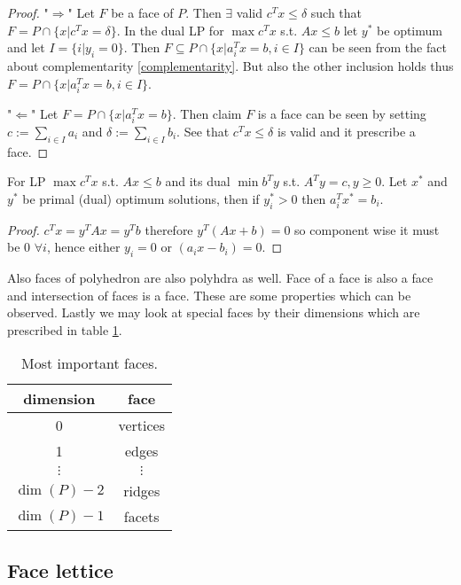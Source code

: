 \begin{proof}
	"$\Rightarrow$" Let $F$ be a face of $P$. Then $\exists$ valid $c^{T} x \leq \delta$ such that $F = P \cap \{x | c^{T} x = \delta\}$. In the dual LP for $\max c^{T} x$ s.t. $A x \leq b$ let $y^{\ast}$ be optimum and let $I = \{i | y_{i} = 0\}$. Then $F \subseteq P \cap \{x | a_{i}^{T} x = b, i \in I\}$ can be seen from the fact about complementarity \ref{complementarity}. But also the other inclusion holds thus  $F = P \cap \{x | a_{i}^{T} x = b, i \in I\}$.
	
	"$\Leftarrow$" Let $F = P \cap \{x | a_{i}^{T} x = b\}$. Then claim $F$ is a face can be seen by setting $c := \sum_{i \in I} a_{i}$ and $\delta := \sum_{i \in I} b_{i}$. See that $c^{T} x \leq \delta$ is valid and it prescribe a face.
\end{proof}

\begin{fact}[Complementarity]
	For LP $\max c^{T}x$ s.t. $A x \leq b$ and its dual $\min b^{T} y$ s.t. $A^{T} y = c, y \geq 0$. Let $x^{\ast}$ and $y^{\ast}$ be primal (dual) optimum solutions, then if $y_{i}^{\ast} > 0$ then $a_{i}^{T} x^{\ast} = b_{i}$.
\end{fact}

\begin{proof}
	$c^{T}x = y^{T}Ax = y^{T}b$ therefore $y^{T}(Ax + b) = 0$ so component wise it must be 0 $\forall i$, hence either $y_{i} = 0$ or $(a_{i}x - b_{i}) =0$.
\end{proof}

Also faces of polyhedron are also polyhdra as well. Face of a face is also a face and intersection of faces is a face. These are some properties which can be observed. Lastly we may look at special faces by their dimensions which are prescribed in table \ref{faces}.

\begin{table}[!ht]\centering
	\begin{tabular}{c|c}
		dimension & face \\
		\hline
		0 & vertices \\
		1 & edges \\
		$\vdots$ & $\vdots$ \\
		$\dim(P) - 2$ & ridges \\
		$\dim(P) - 1$ & facets
	\end{tabular}
	\caption{Most important faces.}
	\label{faces}
\end{table}

\subsection{Face lettice}

